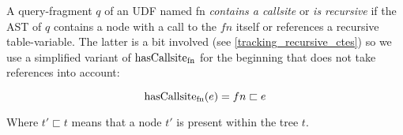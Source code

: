 
A query-fragment $q$ of an UDF named fn \textit{contains a callsite} or \textit{is recursive} if the AST of $q$ contains a node with a call to the $fn$ itself or references a recursive table-variable. The latter is a bit involved (see \autoref{tracking_recursive_ctes}) so we use a simplified variant of $\operatorname{\text{hasCallsite}_{fn}}$ for the beginning that does not take references into account:

$$\operatorname{\text{hasCallsite}_{fn}}(e) = fn \sqsubset e$$

Where $t' \sqsubset t$ means that a node $t'$ is present within the tree $t$.





